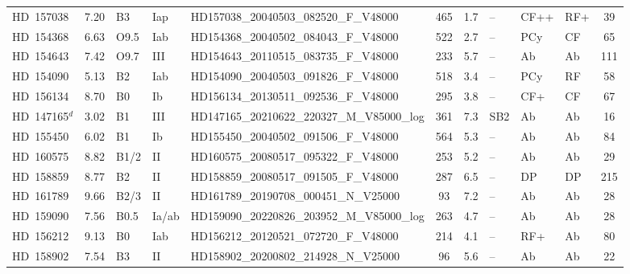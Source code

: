 {\begin{landscape}
\begin{longtable}{lclllcclllc}
\noalign{\smallskip}
HD~157038 & 7.20 & B3 & Iap & HD157038\_20040503\_082520\_F\_V48000 & 465 & 1.7 & -- & CF++ & RF+ & 39 \\
\noalign{\smallskip}
HD~154368 & 6.63 & O9.5 & Iab & HD154368\_20040502\_084043\_F\_V48000 & 522 & 2.7 & -- & PCy & CF & 65 \\
\noalign{\smallskip}
HD~154643 & 7.42 & O9.7 & III & HD154643\_20110515\_083735\_F\_V48000 & 233 & 5.7 & -- & Ab & Ab & 111 \\
\noalign{\smallskip}
HD~154090 & 5.13 & B2 & Iab & HD154090\_20040503\_091826\_F\_V48000 & 518 & 3.4 & -- & PCy & RF & 58 \\
\noalign{\smallskip}
HD~156134 & 8.70 & B0 & Ib & HD156134\_20130511\_092536\_F\_V48000 & 295 & 3.8 & -- & CF+ & CF & 67 \\
\noalign{\smallskip}
HD~147165$^{d}$ & 3.02 & B1 & III & HD147165\_20210622\_220327\_M\_V85000\_log & 361 & 7.3 & SB2 & Ab & Ab & 16 \\
\noalign{\smallskip}
HD~155450 & 6.02 & B1 & Ib & HD155450\_20040502\_091506\_F\_V48000 & 564 & 5.3 & -- & Ab & Ab & 84 \\
\noalign{\smallskip}
HD~160575 & 8.82 & B1/2 & II & HD160575\_20080517\_095322\_F\_V48000 & 253 & 5.2 & -- & Ab & Ab & 29 \\
\noalign{\smallskip}
HD~158859 & 8.77 & B2 & II & HD158859\_20080517\_091505\_F\_V48000 & 287 & 6.5 & -- & DP & DP & 215 \\
\noalign{\smallskip}
HD~161789 & 9.66 & B2/3 & II & HD161789\_20190708\_000451\_N\_V25000 & 93 & 7.2 & -- & Ab & Ab & 28 \\
\noalign{\smallskip}
HD~159090 & 7.56 & B0.5 & Ia/ab & HD159090\_20220826\_203952\_M\_V85000\_log & 263 & 4.7 & -- & Ab & Ab & 28 \\
\noalign{\smallskip}
HD~156212 & 9.13 & B0 & Iab & HD156212\_20120521\_072720\_F\_V48000 & 214 & 4.1 & -- & RF+ & Ab & 80 \\
\noalign{\smallskip}
HD~158902 & 7.54 & B3 & II & HD158902\_20200802\_214928\_N\_V25000 & 96 & 5.6 & -- & Ab & Ab & 22 \\
\end{longtable}

\end{landscape}
}
